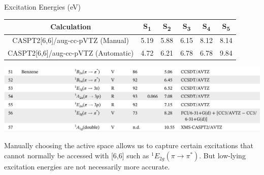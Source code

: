 \documentclass[12pt,aspectratio=169]{beamer}
\begin{document}
	{
	\begin{frame}{Excitation Energies (eV)}
		\begin{center}
			\begin{tabular}{|c|c|c|c|c|c|}
				\hline
				Calculation & S\textsubscript{1} & S\textsubscript{2} & S\textsubscript{3} & S\textsubscript{4} & S\textsubscript{5} \\
				\hline
				CASPT2[6,6]/aug-cc-pVTZ (Manual) & 5.19 & 5.88 & 6.15 & 8.12 & 8.14 \\
				CASPT2[6,6]/aug-cc-pVTZ (Automatic) & 4.72 & 6.21 & 6.78 & 6.78 & 9.84 \\
				\hline
			\end{tabular}
			\includegraphics[width=.9\linewidth]{quest.png}
		\end{center}
		\begin{small}
			Manually choosing the active space allows us to capture certain excitations that cannot normally be accessed with [6,6] such as $^1E_{2g}(\pi\rightarrow\pi^*)$.  But low-lying excitation energies are not necessarily more accurate.
		\end{small}
	\end{frame}
	}
\end{document}
